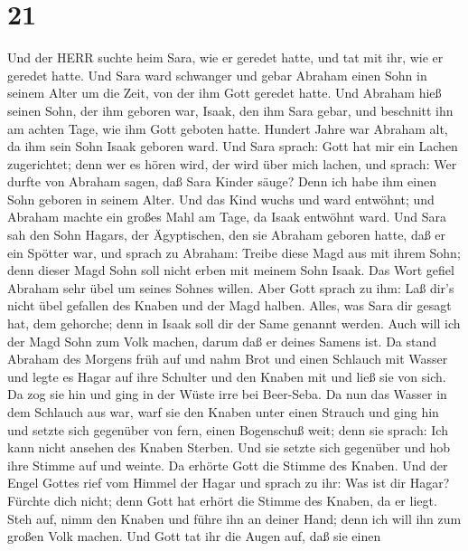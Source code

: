 \hypertarget{section-20}{%
\section{21}\label{section-20}}

 Und der HERR suchte heim Sara, wie er geredet hatte, und
tat mit ihr, wie er geredet hatte.  Und Sara ward schwanger
und gebar Abraham einen Sohn in seinem Alter um die Zeit, von der ihm
Gott geredet hatte.  Und Abraham hieß seinen Sohn, der ihm
geboren war, Isaak, den ihm Sara gebar,  und beschnitt ihn
am achten Tage, wie ihm Gott geboten hatte.  Hundert Jahre
war Abraham alt, da ihm sein Sohn Isaak geboren ward.  Und
Sara sprach: Gott hat mir ein Lachen zugerichtet; denn wer es hören
wird, der wird über mich lachen,  und sprach: Wer durfte von
Abraham sagen, daß Sara Kinder säuge? Denn ich habe ihm einen Sohn
geboren in seinem Alter.  Und das Kind wuchs und ward
entwöhnt; und Abraham machte ein großes Mahl am Tage, da Isaak entwöhnt
ward.  Und Sara sah den Sohn Hagars, der Ägyptischen, den
sie Abraham geboren hatte, daß er ein Spötter war,  und
sprach zu Abraham: Treibe diese Magd aus mit ihrem Sohn; denn dieser
Magd Sohn soll nicht erben mit meinem Sohn Isaak.  Das Wort
gefiel Abraham sehr übel um seines Sohnes willen.  Aber
Gott sprach zu ihm: Laß dir's nicht übel gefallen des Knaben und der
Magd halben. Alles, was Sara dir gesagt hat, dem gehorche; denn in Isaak
soll dir der Same genannt werden.  Auch will ich der Magd
Sohn zum Volk machen, darum daß er deines Samens ist.  Da
stand Abraham des Morgens früh auf und nahm Brot und einen Schlauch mit
Wasser und legte es Hagar auf ihre Schulter und den Knaben mit und ließ
sie von sich. Da zog sie hin und ging in der Wüste irre bei Beer-Seba.
 Da nun das Wasser in dem Schlauch aus war, warf sie den
Knaben unter einen Strauch  und ging hin und setzte sich
gegenüber von fern, einen Bogenschuß weit; denn sie sprach: Ich kann
nicht ansehen des Knaben Sterben. Und sie setzte sich gegenüber und hob
ihre Stimme auf und weinte.  Da erhörte Gott die Stimme des
Knaben. Und der Engel Gottes rief vom Himmel der Hagar und sprach zu
ihr: Was ist dir Hagar? Fürchte dich nicht; denn Gott hat erhört die
Stimme des Knaben, da er liegt.  Steh auf, nimm den Knaben
und führe ihn an deiner Hand; denn ich will ihn zum großen Volk machen.
 Und Gott tat ihr die Augen auf, daß sie einen
